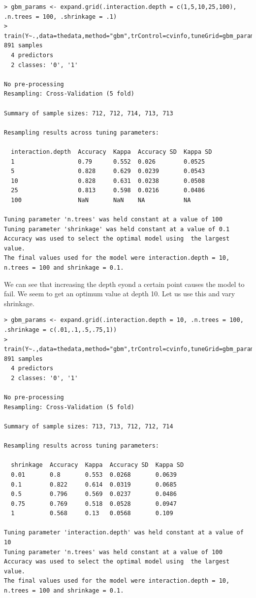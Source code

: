 \documentclass[fontsize=10pt]{scrartcl}
\begin{document}
\begin{enumerate}
\begin{verbatim}
> gbm_params <- expand.grid(.interaction.depth = c(1,5,10,25,100), .n.trees = 100, .shrinkage = .1)
> train(Y~.,data=thedata,method="gbm",trControl=cvinfo,tuneGrid=gbm_params)
891 samples
  4 predictors
  2 classes: '0', '1' 

No pre-processing
Resampling: Cross-Validation (5 fold) 

Summary of sample sizes: 712, 712, 714, 713, 713 

Resampling results across tuning parameters:

  interaction.depth  Accuracy  Kappa  Accuracy SD  Kappa SD
  1                  0.79      0.552  0.026        0.0525  
  5                  0.828     0.629  0.0239       0.0543  
  10                 0.828     0.631  0.0238       0.0508  
  25                 0.813     0.598  0.0216       0.0486  
  100                NaN       NaN    NA           NA      

Tuning parameter 'n.trees' was held constant at a value of 100
Tuning parameter 'shrinkage' was held constant at a value of 0.1
Accuracy was used to select the optimal model using  the largest value.
The final values used for the model were interaction.depth = 10, n.trees = 100 and shrinkage = 0.1. 
\end{verbatim}

			We can see that increasing the depth eyond a certain point causes the model to fail. We seem to get an optimum value at depth 10. Let us use this and vary shrinkage.
\begin{verbatim}
> gbm_params <- expand.grid(.interaction.depth = 10, .n.trees = 100, .shrinkage = c(.01,.1,.5,.75,1))
> train(Y~.,data=thedata,method="gbm",trControl=cvinfo,tuneGrid=gbm_params)
891 samples
  4 predictors
  2 classes: '0', '1' 

No pre-processing
Resampling: Cross-Validation (5 fold) 

Summary of sample sizes: 713, 713, 712, 712, 714 

Resampling results across tuning parameters:

  shrinkage  Accuracy  Kappa  Accuracy SD  Kappa SD
  0.01       0.8       0.553  0.0268       0.0639  
  0.1        0.822     0.614  0.0319       0.0685  
  0.5        0.796     0.569  0.0237       0.0486  
  0.75       0.769     0.518  0.0528       0.0947  
  1          0.568     0.13   0.0568       0.109   

Tuning parameter 'interaction.depth' was held constant at a value of 10
Tuning parameter 'n.trees' was held constant at a value of 100
Accuracy was used to select the optimal model using  the largest value.
The final values used for the model were interaction.depth = 10, n.trees = 100 and shrinkage = 0.1. 
\end{verbatim}


\end{enumerate}
\end{document}
